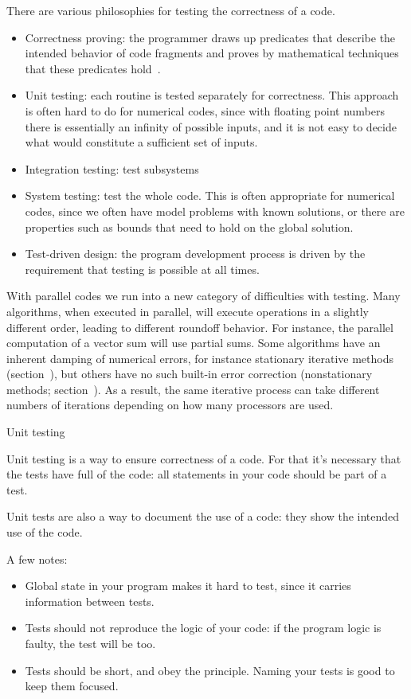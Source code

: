 There are various philosophies for testing the correctness of a code.
\begin{itemize}
\item Correctness proving: the programmer draws up predicates that
  describe the intended behavior of code fragments and proves by
  mathematical techniques that these predicates
  hold~\cite{Hoare1969axiomatic,Dijkstra1974Programming}.
\item Unit testing: each routine is tested separately for
  correctness. This approach is often hard to do for numerical codes,
  since with floating point numbers there is essentially an infinity
  of possible inputs, and it is not easy to decide what would
  constitute a sufficient
  set of inputs.
\item Integration testing: test subsystems
\item System testing: test the whole code. This is often appropriate
  for numerical codes, since we often have model problems with known
  solutions, or there are properties such as bounds that need to hold
  on the global solution.
\item Test-driven design: the program development process is driven by
  the requirement that testing is possible at all times.
\end{itemize}

With parallel codes we run into a new category of difficulties with
testing. Many algorithms, when executed in parallel, will execute
operations in a slightly different order, leading to different
roundoff behavior. For instance, the parallel computation of a vector
sum will use partial sums. Some algorithms have an inherent damping of
numerical errors, for instance stationary iterative methods
(section~), but others have no such built-in error
correction (nonstationary methods;
section~). As a result, the same iterative
process can take different numbers of iterations depending on how many
processors are used.
 
 {Unit testing}

Unit testing is a way to ensure correctness of a code.
For that it's necessary that the tests have full 
of the code: all statements in your code should be part of a test.

Unit tests are also a way to document the use of a code:
they show the intended use of the code.

A few notes:
\begin{itemize}
\item Global state in your program makes it hard to test,
  since it carries information between tests.
\item Tests should not reproduce the logic of your code:
  if the program logic is faulty, the test will be too.
\item Tests should be short, and obey the  principle.
  Naming your tests is good to keep them focused.
\end{itemize}

